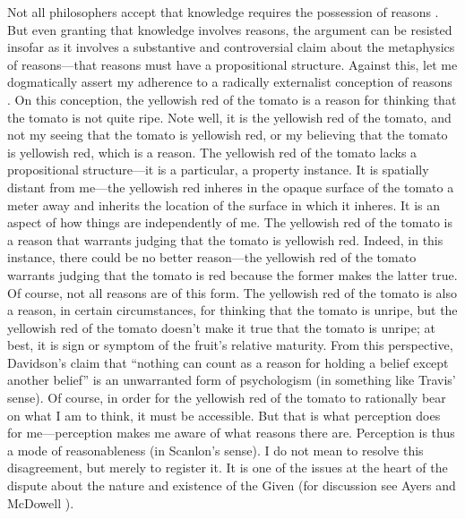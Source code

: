 \documentclass[12pt]{article}
\begin{document}
Not all philosophers accept that knowledge requires the possession of reasons \citep[see][]{Pryor:2007fk}. But even granting that knowledge involves reasons, the argument can be resisted insofar as it involves a substantive and controversial claim about the metaphysics of reasons---that reasons must have a propositional structure. Against this, let me dogmatically assert my adherence to a radically externalist conception of reasons \citep[see][]{Scanlon:1998hb,Raz:2000tm}. On this conception, the yellowish red of the tomato is a reason for thinking that the tomato is not quite ripe. Note well, it is the yellowish red of the tomato, and not my seeing that the tomato is yellowish red, or my believing that the tomato is yellowish red, which is a reason. The yellowish red of the tomato lacks a propositional structure---it is a particular, a property instance. It is spatially distant from me---the yellowish red inheres in the opaque surface of the tomato a meter away and inherits the location of the surface in which it inheres. It is an aspect of how things are independently of me. The yellowish red of the tomato is a reason that warrants judging that the tomato is yellowish red. Indeed, in this instance, there could be no better reason---the yellowish red of the tomato warrants judging that the tomato is red because the former makes the latter true. Of course, not all reasons are of this form. The yellowish red of the tomato is also a reason, in certain circumstances, for thinking that the tomato is unripe, but the yellowish red of the tomato doesn't make it true that the tomato is unripe; at best, it is sign or symptom of the fruit's relative maturity. From this perspective, Davidson's \citeyearpar[310]{Davidson:1986uq} claim that ``nothing can count as a reason for holding a belief except another belief'' is an unwarranted form of psychologism (in something like Travis' \citeyear{Travis:2006fk} sense). Of course, in order for the yellowish red of the tomato to rationally bear on what I am to think, it must be accessible. But that is what perception does for me---perception makes me aware of what reasons there are. Perception is thus a mode of reasonableness (in Scanlon's \citeyear[]{Scanlon:1998hb} sense). I do not mean to resolve this disagreement, but merely to register it. It is one of the issues at the heart of the dispute about the nature and existence of the Given (for discussion see Ayers \citeyear{Ayers:2004kx} and McDowell \citeyear{McDowell:2006vn}).
\end{document}
